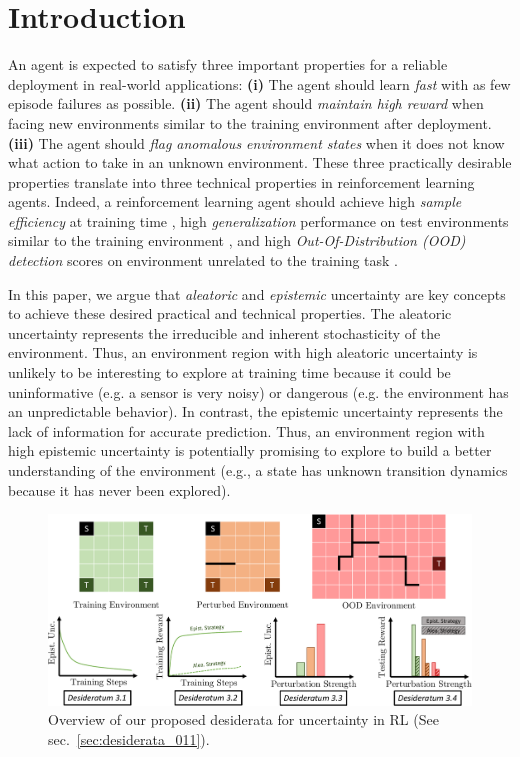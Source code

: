 \vspace{-3mm}
\section{Introduction}
\label{sec:introduction_011}

An agent is expected to satisfy three important properties for a reliable deployment in real-world applications: \textbf{(i)} The agent should learn \emph{fast} with as few episode failures as possible. \textbf{(ii)} The agent should \emph{maintain high reward} when facing new environments similar to the training environment after deployment. \textbf{(iii)} The agent should \emph{flag anomalous environment states} when it does not know what action to take in an unknown environment. These three practically desirable properties translate into three technical properties in reinforcement learning agents. Indeed, a reinforcement learning agent should achieve high \emph{sample efficiency} at training time \cite{sample-efficient-ac}, high \emph{generalization} performance on test environments similar to the training environment \cite{epistemic-pomdp}, and high \emph{Out-Of-Distribution (OOD) detection} scores on environment unrelated to the training task \cite{ood-detection-survey, ood-automotive-perception}. 

In this paper, we argue that \emph{aleatoric} and \emph{epistemic} uncertainty are key concepts to achieve these desired practical and technical properties. The aleatoric uncertainty represents the irreducible and inherent stochasticity of the environment. Thus, an environment region with high aleatoric uncertainty is unlikely to be interesting to explore at training time because it could be uninformative (e.g. a sensor is very noisy) or dangerous (e.g. the environment has an unpredictable behavior). In contrast, the epistemic uncertainty represents the lack of information for accurate prediction. Thus, an environment region with high epistemic uncertainty is potentially promising to explore to build a better understanding of the environment (e.g., a state has unknown transition dynamics because it has never been explored).

\begin{figure}[t]
    \centering
    \includegraphics[width=.99\linewidth]{sections/011_icml2022/resources/diagram-cropped_2.pdf}
    \caption{Overview of our proposed desiderata for uncertainty in RL (See sec.~\ref{sec:desiderata_011}).}
    \label{fig:diagram}
\end{figure}

